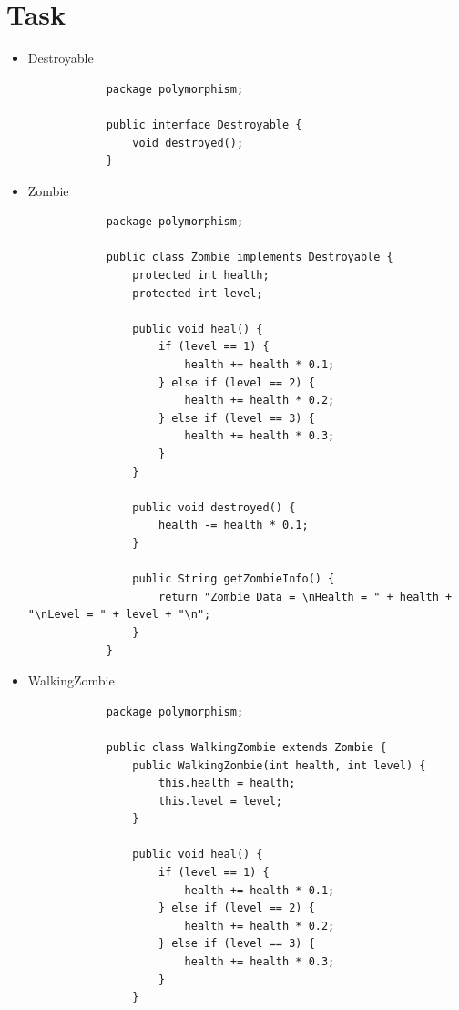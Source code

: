 \documentclass[12pt,titlepage]{article}
\begin{document}
\section{Task}
\begin{itemize}
    \item {
        Destroyable
        \begin{verbatim}
            package polymorphism;

            public interface Destroyable {
                void destroyed();
            }
        \end{verbatim}
    }
    \item {
        Zombie
        \begin{verbatim}
            package polymorphism;

            public class Zombie implements Destroyable {
                protected int health;
                protected int level;

                public void heal() {
                    if (level == 1) {
                        health += health * 0.1;
                    } else if (level == 2) {
                        health += health * 0.2;
                    } else if (level == 3) {
                        health += health * 0.3;
                    }
                }

                public void destroyed() {
                    health -= health * 0.1;
                }

                public String getZombieInfo() {
                    return "Zombie Data = \nHealth = " + health + "\nLevel = " + level + "\n";
                }
            }
        \end{verbatim}
    }
    \pagebreak
    \item {
        WalkingZombie
        \begin{verbatim}
            package polymorphism;

            public class WalkingZombie extends Zombie {
                public WalkingZombie(int health, int level) {
                    this.health = health;
                    this.level = level;
                }

                public void heal() {
                    if (level == 1) {
                        health += health * 0.1;
                    } else if (level == 2) {
                        health += health * 0.2;
                    } else if (level == 3) {
                        health += health * 0.3;
                    }
                }


\end{verbatim}}
\end{itemize}
\end{document}

